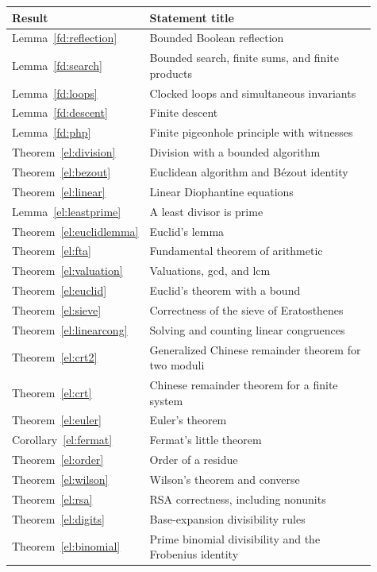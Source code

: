 \begin{longtable}{p{0.16\linewidth}p{0.75\linewidth}}
\toprule Result & Statement title\\
\midrule\endhead
Lemma~\ref{fd:reflection} & Bounded Boolean reflection\\
Lemma~\ref{fd:search} & Bounded search, finite sums, and finite products\\
Lemma~\ref{fd:loops} & Clocked loops and simultaneous invariants\\
Lemma~\ref{fd:descent} & Finite descent\\
Lemma~\ref{fd:php} & Finite pigeonhole principle with witnesses\\
Theorem~\ref{el:division} & Division with a bounded algorithm\\
Theorem~\ref{el:bezout} & Euclidean algorithm and B\'ezout identity\\
Theorem~\ref{el:linear} & Linear Diophantine equations\\
Lemma~\ref{el:leastprime} & A least divisor is prime\\
Theorem~\ref{el:euclidlemma} & Euclid's lemma\\
Theorem~\ref{el:fta} & Fundamental theorem of arithmetic\\
Theorem~\ref{el:valuation} & Valuations, gcd, and lcm\\
Theorem~\ref{el:euclid} & Euclid's theorem with a bound\\
Theorem~\ref{el:sieve} & Correctness of the sieve of Eratosthenes\\
Theorem~\ref{el:linearcong} & Solving and counting linear congruences\\
Theorem~\ref{el:crt2} & Generalized Chinese remainder theorem for two moduli\\
Theorem~\ref{el:crt} & Chinese remainder theorem for a finite system\\
Theorem~\ref{el:euler} & Euler's theorem\\
Corollary~\ref{el:fermat} & Fermat's little theorem\\
Theorem~\ref{el:order} & Order of a residue\\
Theorem~\ref{el:wilson} & Wilson's theorem and converse\\
Theorem~\ref{el:rsa} & RSA correctness, including nonunits\\
Theorem~\ref{el:digits} & Base-expansion divisibility rules\\
Theorem~\ref{el:binomial} & Prime binomial divisibility and the Frobenius identity\\

\end{longtable}
